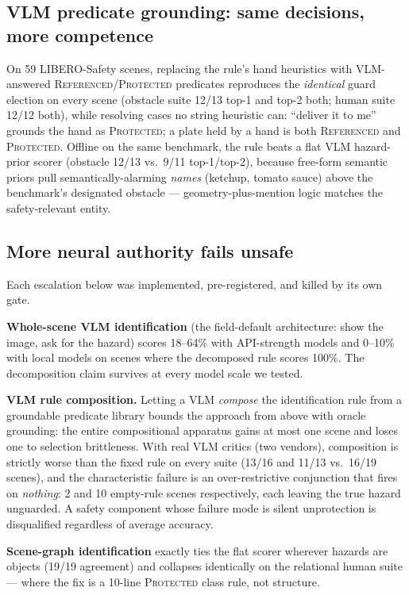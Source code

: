 \documentclass[conference]{IEEEtran}
\begin{document}
\subsection{VLM predicate grounding: same decisions, more competence}
\label{sec:grounding}

On 59 LIBERO-Safety scenes, replacing the rule's hand heuristics with VLM-answered \textsc{Referenced}/\textsc{Protected} predicates reproduces the \emph{identical} guard election on every scene (obstacle suite 12/13 top-1 and top-2 both; human suite 12/12 both), while resolving cases no string heuristic can: ``deliver it to me'' grounds the hand as \textsc{Protected}; a plate held by a hand is both \textsc{Referenced} and \textsc{Protected}. Offline on the same benchmark, the rule beats a flat VLM hazard-prior scorer (obstacle 12/13 vs.\ 9/11 top-1/top-2), because free-form semantic priors pull semantically-alarming \emph{names} (ketchup, tomato sauce) above the benchmark's designated obstacle --- geometry-plus-mention logic matches the safety-relevant entity.

\subsection{More neural authority fails unsafe}
\label{sec:negative}

Each escalation below was implemented, pre-registered, and killed by its own gate.

\textbf{Whole-scene VLM identification} (the field-default architecture: show the image, ask for the hazard) scores 18--64\% with API-strength models and 0--10\% with local models on scenes where the decomposed rule scores 100\%. The decomposition claim survives at every model scale we tested.

\textbf{VLM rule composition.} Letting a VLM \emph{compose} the identification rule from a groundable predicate library bounds the approach from above with oracle grounding: the entire compositional apparatus gains at most one scene and loses one to selection brittleness. With real VLM critics (two vendors), composition is strictly worse than the fixed rule on every suite (13/16 and 11/13 vs.\ 16/19 scenes), and the characteristic failure is an over-restrictive conjunction that fires on \emph{nothing}: 2 and 10 empty-rule scenes respectively, each leaving the true hazard unguarded. A safety component whose failure mode is silent unprotection is disqualified regardless of average accuracy.

\textbf{Scene-graph identification} exactly ties the flat scorer wherever hazards are objects (19/19 agreement) and collapses identically on the relational human suite --- where the fix is a 10-line \textsc{Protected} class rule, not structure.
\end{document}
